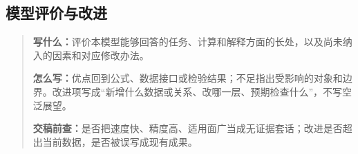 \subsection{模型评价与改进}
\begin{quote}\small
\noindent\textbf{\color{inkblue}写什么：}评价本模型能够回答的任务、计算和解释方面的长处，以及尚未纳入的因素和对应修改办法。\par
\noindent\textbf{\color{inkblue}怎么写：}优点回到公式、数据接口或检验结果；不足指出受影响的对象和边界。改进项写成“新增什么数据或关系、改哪一层、预期检查什么”，不写空泛展望。\par
\noindent\textbf{\color{inkblue}交稿前查：}是否把速度快、精度高、适用面广当成无证据套话；改进是否超出当前数据，是否被误写成现有成果。
\end{quote}

